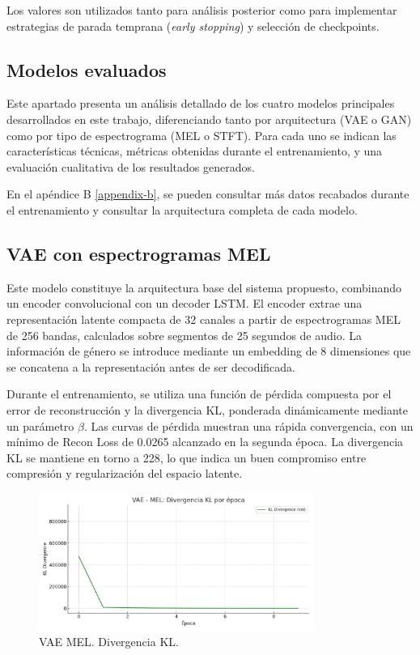Los valores son utilizados tanto para análisis posterior como para implementar estrategias de parada temprana (\textit{early stopping}) y selección de checkpoints.

\subsection{Modelos evaluados}

Este apartado presenta un análisis detallado de los cuatro modelos principales desarrollados en este trabajo, diferenciando tanto por arquitectura (VAE o GAN) como por tipo de espectrograma (MEL o STFT). Para cada uno se indican las características técnicas, métricas obtenidas durante el entrenamiento, y una evaluación cualitativa de los resultados generados.

En el apéndice B \ref{appendix-b}, se pueden consultar más datos recabados durante el entrenamiento y consultar la arquitectura completa de cada modelo.

\subsection{VAE con espectrogramas MEL}

Este modelo constituye la arquitectura base del sistema propuesto, combinando un encoder convolucional con un decoder LSTM. El encoder extrae una representación latente compacta de 32 canales a partir de espectrogramas MEL de 256 bandas, calculados sobre segmentos de 25 segundos de audio. La información de género se introduce mediante un embedding de 8 dimensiones que se concatena a la representación antes de ser decodificada.

Durante el entrenamiento, se utiliza una función de pérdida compuesta por el error de reconstrucción y la divergencia KL, ponderada dinámicamente mediante un parámetro $\beta$. Las curvas de pérdida muestran una rápida convergencia, con un mínimo de Recon Loss de 0.0265 alcanzado en la segunda época. La divergencia KL se mantiene en torno a 228, lo que indica un buen compromiso entre compresión y regularización del espacio latente.

\begin{figure}[H]
    \centering
    \includegraphics[width=0.8\textwidth]{images/vae_mel_kl_plot.png}
    \caption{VAE MEL. Divergencia KL.}
\end{figure}

